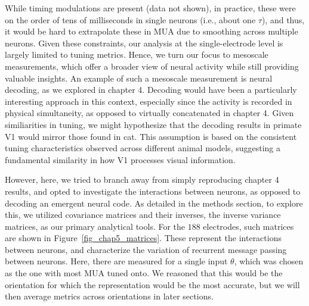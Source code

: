 While timing modulations are present (data not shown), in practice, these were on the order of tens of milliseconds in single neurons (i.e., about one $\tau$), and thus, it would be hard to extrapolate these in \gls{MUA} due to smoothing across multiple neurons. Given these constraints, our analysis at the single-electrode level is largely limited to tuning metrics. Hence, we turn our focus to mesoscale measurements, which offer a broader view of neural activity while still providing valuable insights. 
An example of such a mesoscale measurement is neural decoding, as we explored in chapter 4. Decoding would have been a particularly interesting approach in this context, especially since the activity is recorded in physical simultaneity, as opposed to virtually concatenated in chapter 4. Given similiarities in tuning, we might hypothesize that the decoding results in primate \gls{V1} would mirror those found in cat. This assumption is based on the consistent tuning characteristics observed across different animal models, suggesting a fundamental similarity in how \gls{V1} processes visual information.

However, here, we tried to branch away from simply reproducing chapter 4 results, and opted to investigate the interactions between neurons, as opposed to decoding an emergent neural code. As detailed in the methods section, to explore this, we utilized covariance matrices and their inverses, the inverse variance matrices, as our primary analytical tools.
For the $188$ electrodes, such matrices are shown in Figure~\ref{fig_chap5_matrices}. These represent the interactions between neurons, and characterize the variation of recurrent message passing between neurons. Here, there are measured for a single input $\theta$, which was chosen as the one with most \gls{MUA} tuned onto. We reasoned that this would be the orientation for which the representation would be the most accurate, but we will then average metrics across orientations in later sections.

